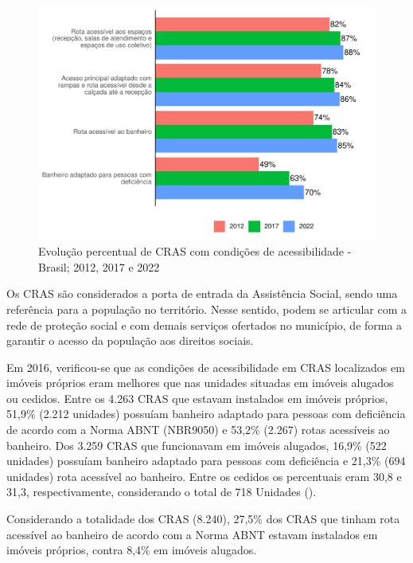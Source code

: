 \documentclass[
  brazilian]{report}
\begin{document}
\begin{figure}
\includegraphics{Censo-SUAS-2022_files/figure-latex/CRAS-acessibilidade-1} \caption[Evolução percentual de CRAS com condições de acessibilidade - Brasil]{Evolução percentual de CRAS com condições de acessibilidade - Brasil; 2012, 2017 e 2022}\label{fig:CRAS-acessibilidade}
\end{figure}

Os CRAS são considerados a porta de entrada da Assistência Social, sendo
uma referência para a população no território. Nesse sentido, podem se
articular com a rede de proteção social e com demais serviços ofertados
no município, de forma a garantir o acesso da população aos direitos
sociais.

Em 2016, verificou-se que as condições de acessibilidade em CRAS
localizados em imóveis próprios eram melhores que nas unidades situadas
em imóveis alugados ou cedidos. Entre os 4.263 CRAS que estavam
instalados em imóveis próprios, 51,9\% (2.212 unidades) possuíam
banheiro adaptado para pessoas com deficiência de acordo com a Norma
ABNT (NBR9050) e 53,2\% (2.267) rotas acessíveis ao banheiro. Dos 3.259
CRAS que funcionavam em imóveis alugados, 16,9\% (522 unidades) possuíam
banheiro adaptado para pessoas com deficiência e 21,3\% (694 unidades)
rota acessível ao banheiro. Entre os cedidos os percentuais eram 30,8 e
31,3, respectivamente, considerando o total de 718 Unidades
().

Considerando a totalidade dos CRAS (8.240), 27,5\% dos CRAS que tinham
rota acessível ao banheiro de acordo com a Norma ABNT estavam instalados
em imóveis próprios, contra 8,4\% em imóveis alugados.
\end{document}
